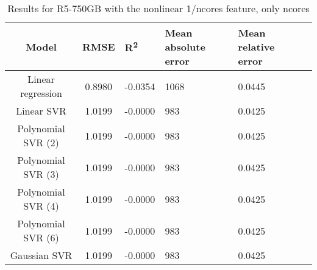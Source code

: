 \begin{table}[H]
\centering
\begin{adjustbox}{center}
\begin{tabular}{c | c M{1.2cm} M{2.5cm} M{2.5cm} M{1.8cm}}
Model & RMSE & R\textsuperscript{2} & Mean absolute error & Mean relative error \tabularnewline
\hline
Linear regression & 0.8980 & -0.0354 &   1068 & 0.0445 \\
Linear SVR & 1.0199 & -0.0000 &    983 & 0.0425 \\
Polynomial SVR (2) & 1.0199 & -0.0000 &    983 & 0.0425 \\
Polynomial SVR (3) & 1.0199 & -0.0000 &    983 & 0.0425 \\
Polynomial SVR (4) & 1.0199 & -0.0000 &    983 & 0.0425 \\
Polynomial SVR (6) & 1.0199 & -0.0000 &    983 & 0.0425 \\
Gaussian SVR & 1.0199 & -0.0000 &    983 & 0.0425 \\
\end{tabular}
\end{adjustbox}
\\
\caption{Results for R5-750GB with the nonlinear 1/ncores feature, only ncores}
\label{tab:all_nonlinear_R5_750}
\end{table}
